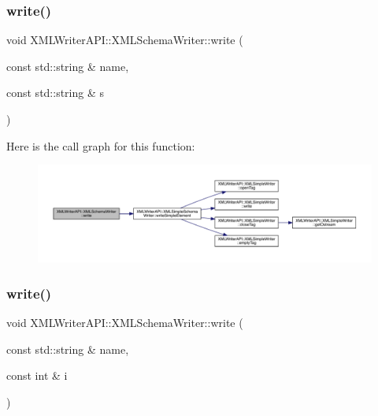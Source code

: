 \subsubsection{\texorpdfstring{write()}{write()}\hspace{0.1cm}{\footnotesize\ttfamily [2/10]}}
{\footnotesize\ttfamily void X\+M\+L\+Writer\+A\+P\+I\+::\+X\+M\+L\+Schema\+Writer\+::write (\begin{DoxyParamCaption}\item[{const std\+::string \&}]{name,  }\item[{const std\+::string \&}]{s }\end{DoxyParamCaption})\hspace{0.3cm}{\ttfamily [inline]}}

Here is the call graph for this function\+:
\nopagebreak
\begin{figure}[H]
\begin{center}
\leavevmode
\includegraphics[width=350pt]{db/d34/classXMLWriterAPI_1_1XMLSchemaWriter_a1922edfcbb9d52c70949fd8c8dd97569_cgraph}
\end{center}
\end{figure}
\mbox{\label{classXMLWriterAPI_1_1XMLSchemaWriter_a1b951af62e2106b76e33022c0f1b5d88}} 
\subsubsection{\texorpdfstring{write()}{write()}\hspace{0.1cm}{\footnotesize\ttfamily [3/10]}}
{\footnotesize\ttfamily void X\+M\+L\+Writer\+A\+P\+I\+::\+X\+M\+L\+Schema\+Writer\+::write (\begin{DoxyParamCaption}\item[{const std\+::string \&}]{name,  }\item[{const int \&}]{i }\end{DoxyParamCaption})\hspace{0.3cm}{\ttfamily [inline]}}

